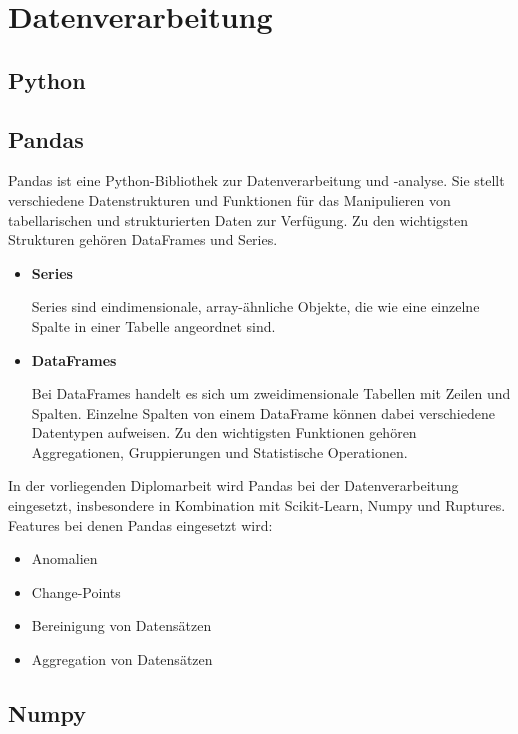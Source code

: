 \documentclass{report}
\begin{document}
\section{Datenverarbeitung}
\subsection{Python}
\subsection{Pandas}
Pandas ist eine Python-Bibliothek zur Datenverarbeitung und -analyse. Sie stellt verschiedene Datenstrukturen und Funktionen für das Manipulieren von tabellarischen und strukturierten Daten zur Verfügung. Zu den wichtigsten Strukturen gehören DataFrames und Series.
\begin{itemize}
    \item \textbf{Series} \\
    \begin{minipage}[t]{\linewidth}
        Series sind eindimensionale, array-ähnliche Objekte, die wie eine einzelne Spalte in einer Tabelle angeordnet sind.
    \end{minipage}

    \item \textbf{DataFrames} \\
    \begin{minipage}[t]{\linewidth}
        Bei DataFrames handelt es sich um zweidimensionale Tabellen mit Zeilen und Spalten. Einzelne Spalten von einem DataFrame können dabei verschiedene Datentypen aufweisen. Zu den wichtigsten Funktionen gehören Aggregationen, Gruppierungen und Statistische Operationen. 
    \end{minipage}
\end{itemize}
  In der vorliegenden Diplomarbeit wird Pandas bei der Datenverarbeitung eingesetzt, insbesondere in Kombination mit Scikit-Learn, Numpy und Ruptures.
  Features bei denen Pandas eingesetzt wird:
  \begin{itemize}
      \item Anomalien
      \item Change-Points
      \item Bereinigung von Datensätzen
      \item Aggregation von Datensätzen
  \end{itemize}




\subsection{Numpy}
\end{document}
